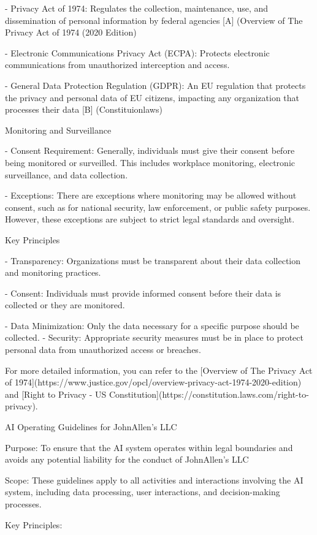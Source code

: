 \documentclass[12pt,letterpaper]{article}
\begin{document}
- Privacy Act of 1974: Regulates the collection, maintenance, use, and dissemination of personal information by federal agencies [A] (Overview of The Privacy Act of 1974 (2020 Edition) 


- Electronic Communications Privacy Act (ECPA): Protects electronic communications from unauthorized interception and access.

- General Data Protection Regulation (GDPR): An EU regulation that protects the privacy and personal data of EU citizens, impacting any organization that processes their data [B] (Constituionlaws) 

 Monitoring and Surveillance

- Consent Requirement: Generally, individuals must give their consent before being monitored or surveilled. This includes workplace monitoring, electronic surveillance, and data collection.

- Exceptions: There are exceptions where monitoring may be allowed without consent, such as for national security, law enforcement, or public safety purposes. However, these exceptions are subject to strict legal standards and oversight.

 Key Principles

- Transparency: Organizations must be transparent about their data collection and monitoring practices.

- Consent: Individuals must provide informed consent before their data is collected or they are monitored.

- Data Minimization: Only the data necessary for a specific purpose should be collected.
- Security: Appropriate security measures must be in place to protect personal data from unauthorized access or breaches.

For more detailed information, you can refer to the [Overview of The Privacy Act of 1974](https://www.justice.gov/opcl/overview-privacy-act-1974-2020-edition) and [Right to Privacy - US Constitution](https://constitution.laws.com/right-to-privacy).


AI Operating Guidelines for JohnAllen’s LLC

Purpose: To ensure that the AI system operates within legal boundaries and avoids any potential liability for the conduct of JohnAllen’s LLC

Scope: These guidelines apply to all activities and interactions involving the AI system, including data processing, user interactions, and decision-making processes.

Key Principles:
\end{document}
